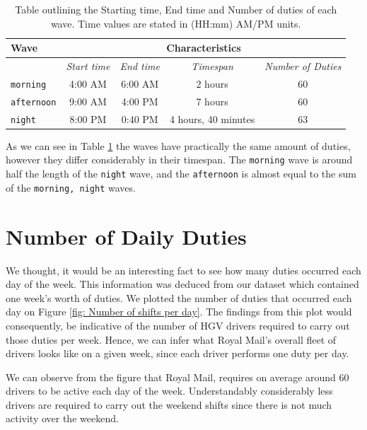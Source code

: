 \begin{table}[ht]
\small
    \centering 
    \begin{tabular}{|l|c|c|c|c|}
        \hline
        \textbf{Wave} & \multicolumn{4}{|c|}{ \textbf{Characteristics}} \\
        \hline
        & \textit{Start time} & \textit{End time} & \textit{Timespan}  & \textit{Number of Duties}  \\
        \hline
        \texttt{morning} & 4:00 AM & 6:00 AM & 2 hours & 60 \\
        \hline
        \texttt{afternoon} & 9:00 AM & 4:00 PM & 7 hours & 60 \\
        \hline
        \texttt{night} & 8:00 PM & 0:40 PM & 4 hours, 40 minutes & 63 \\
        \hline
    \end{tabular}%
    \medbreak
    \caption{Table outlining the Starting time, End time and Number of duties of each wave. Time values are stated in (HH:mm) AM/PM units.}
    \label{table:Starting Waves}
\end{table}

\vspace{\baselineskip}
\noindent
As we can see in Table \ref{table:Starting Waves} the waves have practically the same amount of duties, however they differ considerably in their timespan. The \texttt{morning} wave is around half the length of the \texttt{night} wave, and the \texttt{afternoon} is almost equal to the sum of the \texttt{morning, night} waves.    

\section{Number of Daily Duties}
We thought, it would be an interesting fact to see how many duties occurred each day of the week. This information was deduced from our dataset which contained one week's worth of duties. We plotted the number of duties that occurred each day on Figure \ref{fig: Number of shifts per day}. The findings from this plot would consequently, be indicative of the number of HGV drivers required to carry out those duties per week. Hence, we can infer what Royal Mail's overall fleet of drivers looks like on a given week, since each driver performs one duty per day. 

\vspace{\baselineskip}
\noindent
We can observe from the figure that Royal Mail, requires on average around 60 drivers to be active each day of the week. Understandably considerably less drivers are required to carry out the weekend shifts since there is not much activity over the weekend.   

